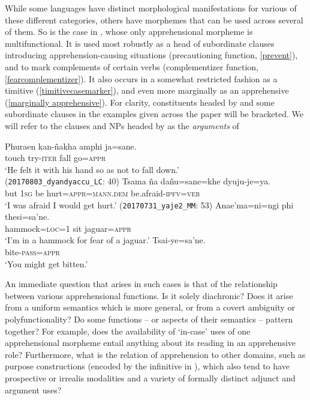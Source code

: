 \documentclass[output=paper,colorlinks,citecolor=brown]{langscibook}
\begin{document}
While some languages have distinct morphological manifestations for various of these different categories, others have morphemes that can be used across several of them. So is the case in , whose only apprehensional morpheme  is multifunctional. It is used most robustly as a head of subordinate clauses introducing apprehension-causing situations (precautioning function, \ref{prevent}), and to mark complements of certain verbs (complementizer function, \ref{fearcomplementizer}). It also occurs in a somewhat restricted fashion as a timitive (\ref{timitivecasemarker}), and even more marginally as an apprehensive (\ref{marginally apprehensive}). For clarity, constituents headed by  and some subordinate clauses in the examples given across the paper will be bracketed. {We will refer to the clauses and NPs headed by  as the \textit{arguments} of \sane[.]}
\begin{exe}
    \ex \label{prevent} %
    \gll Phuraen kan-ñakha    {\ob}amphi ja=sane.{\cb} \\
         touch   try-\textsc{iter}  fall go=\textsc{appr}\\
    \glt `He felt {it} with his hand so as not to fall down.' \\
    \hfill (\texttt{20170803\_dyandyaccu\_LC}: {\textsc{40}})
    \ex \label{fearcomplementizer} %
    \gll Tsama ña   {\ob}{dañu=sane=khe{\cb}}         dyuju-je=ya. \\
         but \textsc{1sg} {be hurt=\textsc{appr=mann.dem}} {be.afraid-\textsc{ipfv=ver}}\\
    \glt `I was afraid I would get hurt.'
    \hfill (\texttt{20170731\_yaje2\_MM}: {\textsc{53}})
    \ex \label{timitivecasemarker} %
    \gll Anae'ma=ni=ngi phi {\ob}thesi=sa'ne.{\cb} \\
         hammock=\textsc{loc=}1 sit jaguar=\textsc{appr}   \\
    \glt `I'm in a hammock for fear of a jaguar.'
    \ex  \label{marginally apprehensive} %
    \gll {\ob}Tsai-ye=sa'ne.{\cb}   \\
         bite-\textsc{pass=appr}    \\
    \glt `You might get bitten.'
\end{exe}

An immediate question that arises in such cases is that of the relationship between various apprehensional functions. Is it solely diachronic? Does it arise from a uniform semantics which is more general, or from a covert ambiguity or polyfunctionality? Do some functions -- or aspects of their semantics -- pattern together? For example, does the availability of `in-case' uses of one apprehensional morpheme entail anything about its reading in an apprehensive role? {Furthermore, what is the relation of apprehension to other domains, such as purpose constructions (encoded by the infinitive in ), which also tend to have prospective or irrealis modalities and a variety of formally distinct adjunct and argument uses?}
\end{document}
